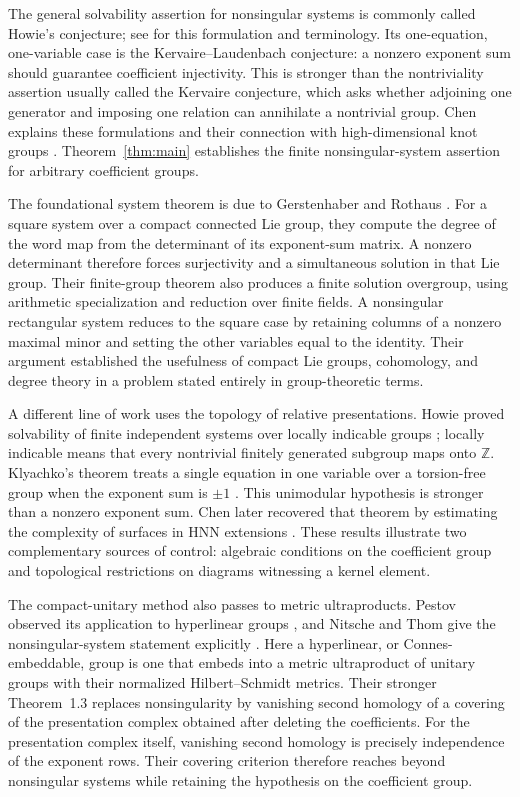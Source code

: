 The general solvability assertion for nonsingular systems is commonly
called Howie's conjecture; see \cite[Introduction]{KlyachkoMikheenkoRomankov2024}
for this formulation and terminology. Its one-equation, one-variable
case is the Kervaire--Laudenbach conjecture: a nonzero exponent sum
should guarantee coefficient injectivity. This is stronger than the
nontriviality assertion usually called the Kervaire conjecture, which
asks whether adjoining one generator and imposing one relation can
annihilate a nontrivial group. Chen explains these formulations and their
connection with high-dimensional knot groups
\cite[Section~1]{Chen2026}. Theorem~\ref{thm:main} establishes the
finite nonsingular-system assertion for arbitrary coefficient groups.

The foundational system theorem is due to Gerstenhaber and Rothaus
\cite{GerstenhaberRothaus1962}. For a square system over a compact
connected Lie group, they compute the degree of the word map from the
determinant of its exponent-sum matrix. A nonzero determinant therefore
forces surjectivity and a simultaneous solution in that Lie group.
Their finite-group theorem also produces a finite solution overgroup,
using arithmetic specialization and reduction over finite fields.
A nonsingular rectangular
system reduces to the square case by retaining columns of a nonzero
maximal minor and setting the other variables equal to the identity. Their
argument established the usefulness of compact Lie groups, cohomology,
and degree theory in a problem stated entirely in group-theoretic terms.

A different line of work uses the topology of relative presentations.
Howie proved solvability of finite independent systems over locally
indicable groups \cite[Corollary~4.2]{Howie1981}; locally indicable
means that every nontrivial finitely generated subgroup maps onto
$\mathbb Z$. Klyachko's theorem treats a single equation in one variable
over a torsion-free group when the exponent sum is $\pm1$
\cite{Klyachko1993}. This unimodular hypothesis is stronger than a
nonzero exponent sum. Chen later recovered that theorem by estimating
the complexity of surfaces in HNN extensions
\cite[Theorem~6.9]{Chen2026}. These results illustrate two complementary
sources of control: algebraic conditions on the coefficient group and
topological restrictions on diagrams witnessing a kernel element.

The compact-unitary method also passes to metric ultraproducts. Pestov
observed its application to hyperlinear groups
\cite[Corollary~10.4]{Pestov2008}, and Nitsche and Thom give the
nonsingular-system statement explicitly
\cite[Theorem~1.2 and Lemma~2.1]{NitscheThom2022}. Here a hyperlinear,
or Connes-embeddable, group is one that embeds into a metric ultraproduct
of unitary groups with their normalized Hilbert--Schmidt metrics.
Their stronger Theorem~1.3 replaces nonsingularity by vanishing second
homology of a covering of the presentation complex obtained after
deleting the coefficients. For the presentation complex itself,
vanishing second homology is precisely independence of the exponent
rows. Their covering criterion therefore reaches beyond nonsingular
systems while retaining the hypothesis on the coefficient group.


